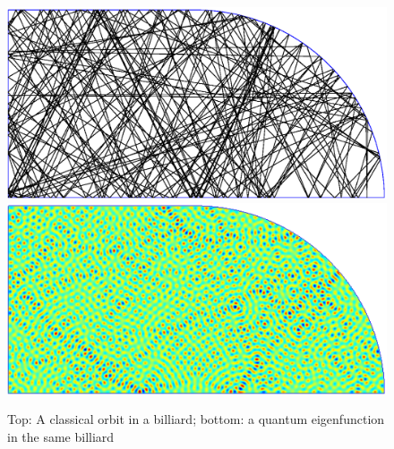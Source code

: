 \documentclass{report}
\begin{document}
\begin{figure}[h!]
  \begin{center}
    \includegraphics[width=\textwidth]{figs/classical/stadium_orbit.eps}
    \linebreak
    \includegraphics[width=\textwidth]{figs/classical/stadium_eigenfunction.eps}
    \caption{Top: A classical orbit in a billiard; bottom: a quantum eigenfunction in the same billiard}
    \label{fig:classical_vs_quantum}
  \end{center}
\end{figure}
\end{document}
